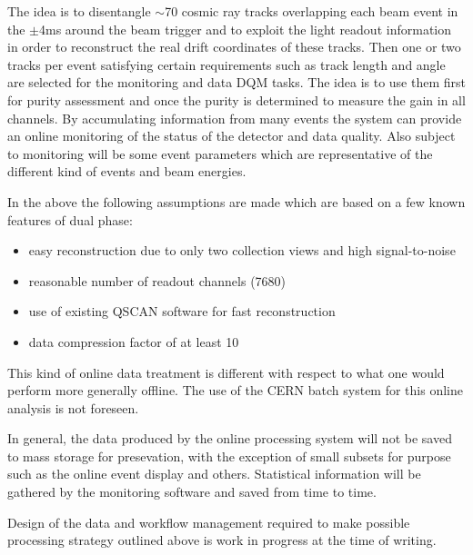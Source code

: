 \documentclass[12pt]{article}
\begin{document}
The idea is to disentangle $\sim$70 cosmic ray tracks overlapping each beam event in the $\pm$4ms around the beam trigger
and to exploit the light readout information in order to reconstruct the real drift coordinates of these tracks.
Then one or two tracks per event satisfying certain requirements such as track length and angle are selected for the monitoring and
data DQM tasks. The idea is to use them first for purity assessment and once the purity is determined to measure the gain in all
channels. By accumulating information from many events the system can provide an online monitoring of the status of the detector
and data quality. Also subject to monitoring will be some event parameters which are representative of the different kind of events and
beam energies.

In the above the following assumptions are made which are based on a few known features of dual phase:
\begin{itemize}
\item easy reconstruction due to only two collection views and high signal-to-noise
\item reasonable number of readout channels (7680)
\item use of existing QSCAN software for fast reconstruction
\item data compression factor of at least 10
\end{itemize}

\noindent This kind of online data treatment is  different with respect to what one would perform
more generally offline. The use of the CERN batch system for this online analysis is not foreseen.

In general, the data produced by the online processing system will not be saved to mass storage for presevation, with
the exception of small subsets for purpose such as the online event display and others. Statistical information will be gathered by
the monitoring software and saved from time to time.

Design of the data and workflow management required to make possible processing strategy outlined above is work in progress
at the time of writing.

\end{document}
